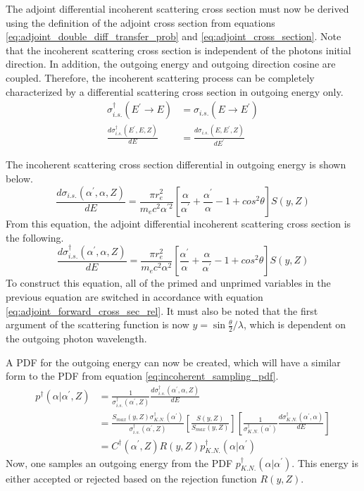 The adjoint differential incoherent scattering cross section must now be 
derived using the definition of the adjoint cross section from equations
\ref{eq:adjoint_double_diff_transfer_prob} and \ref{eq:adjoint_cross_section}.
Note that the incoherent scattering cross section is independent of the photons
initial direction. In addition, the outgoing energy and outgoing direction
cosine are coupled. Therefore, the incoherent scattering process can be 
completely characterized by a differential scattering cross section in outgoing
energy only. 
\begin{align}
  \sigma_{i.s.}^{\dagger}(E^{'} \to E) & = \sigma_{i.s.}(E \to E^{'}) \nonumber \\
  \frac{d\sigma_{i.s.}^{\dagger}(E^{'},E,Z)}{dE} & = 
  \frac{d\sigma_{i.s.}(E,E^{'},Z)}{dE^{'}}
  \label{eq:adjoint_forward_cross_sec_rel}
\end{align}

The incoherent scattering cross section differential in outgoing energy is 
shown below. 
\begin{equation}
  \frac{d\sigma_{i.s.}(\alpha^{'},\alpha,Z)}{dE} = 
  \frac{\pi r_e^2}{m_ec^2 \alpha^{'2}}
  \left[\frac{\alpha}{\alpha^{'}} + \frac{\alpha^{'}}{\alpha} - 1 + cos^2\theta
    \right] S(y,Z)
\end{equation}
From this equation, the adjoint differential incoherent scattering cross section
is the following.  
\begin{equation}
  \frac{d\sigma_{i.s.}^{\dagger}(\alpha^{'},\alpha,Z)}{dE} = 
  \frac{\pi r_e^2}{m_ec^2 \alpha^{2}}
  \left[\frac{\alpha^{'}}{\alpha} + \frac{\alpha}{\alpha^{'}} - 1 + cos^2\theta
    \right] S(y,Z)
  \label{eq:diff_adjoint_incoh_scatt_cross_sec_energy}
\end{equation}
To construct this equation, all of the primed and unprimed 
variables in the previous equation are switched in accordance with equation
\ref{eq:adjoint_forward_cross_sec_rel}. It must also be noted that the first 
argument of the scattering function is now 
$y = \sin{\frac{\theta}{2}}/\lambda$, which is dependent on the outgoing
photon wavelength.

A PDF for the outgoing energy can now be created, which will have a similar
form to the PDF from equation \ref{eq:incoherent_sampling_pdf}.
\begin{align}
  p^{\dagger}(\alpha|\alpha^{'},Z) & = \frac{1}{\sigma_{i.s.}^{\dagger}(\alpha^{'},Z)}
  \frac{d\sigma_{i.s.}^{\dagger}(\alpha^{'},\alpha,Z)}{dE} \nonumber \\
  & = \frac{S_{max}(y,Z)\sigma_{K.N.}^{\dagger}(\alpha^{'})}
       {\sigma_{i.s.}^{\dagger}(\alpha^{'},Z)} 
       \left[\frac{S(y,Z)}{S_{max}(y,Z)}\right]
       \left[\frac{1}{\sigma_{K.N.}^{\dagger}(\alpha^{'})}
         \frac{d\sigma_{K.N.}^{\dagger}(\alpha^{'},\alpha)}{dE}\right] \nonumber \\
  & = C^{\dagger}(\alpha^{'},Z)R(y,Z)p_{K.N.}^{\dagger}(\alpha|\alpha^{'})
  \label{eq:adj_incoherent_sampling_pdf}
\end{align}
Now, one samples an outgoing energy from the PDF 
$p_{K.N.}^{\dagger}(\alpha|\alpha^{'})$. This energy is either accepted or rejected
based on the rejection function $R(y,Z)$.

